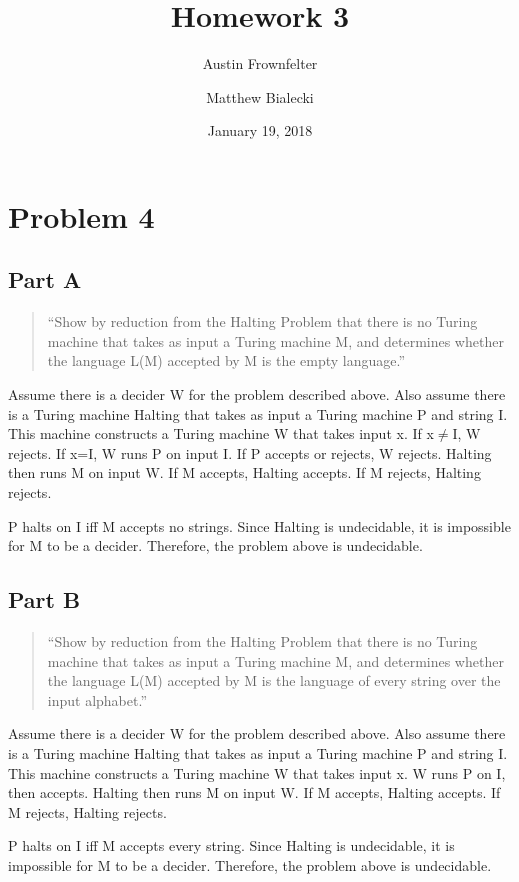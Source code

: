 \documentclass{article}
\title{Homework 3}
\author{Austin Frownfelter \and Matthew Bialecki}
\date{January 19, 2018}
\begin{document}
\maketitle

\section{Problem 4}

\subsection{Part A}
\begin{quote}
``Show by reduction from the Halting Problem that there is no Turing machine that takes as input a Turing machine M, and determines whether the language L(M) accepted by M is the empty language.''
\end{quote}
Assume there is a decider W for the problem described above.  Also assume there is a Turing machine Halting that takes as input a Turing machine P and string I.  This machine constructs a Turing machine W that takes input x.  If x$\neq$I, W rejects.  If x=I, W runs P on input I.  If P accepts or rejects, W rejects.  Halting then runs M on input W.  If M accepts, Halting accepts.  If M rejects, Halting rejects.

P halts on I iff M accepts no strings.  Since Halting is undecidable, it is impossible for M to be a decider.  Therefore, the problem above is undecidable.

\subsection{Part B}
\begin{quote}
``Show by reduction from the Halting Problem that there is no Turing machine that takes as input a Turing machine M, and determines whether the language L(M) accepted by M is the language of every string over the input alphabet.''
\end{quote}
Assume there is a decider W for the problem described above.  Also assume there is a Turing machine Halting that takes as input a Turing machine P and string I.  This machine constructs a Turing machine W that takes input x.  W runs P on I, then accepts.  Halting then runs M on input W.  If M accepts, Halting accepts.  If M rejects, Halting rejects.

P halts on I iff M accepts every string.  Since Halting is undecidable, it is impossible for M to be a decider.  Therefore, the problem above is undecidable.
\end{document}
